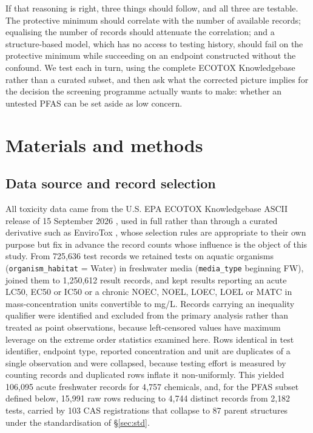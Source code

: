 \documentclass[preprint,12pt]{elsarticle}
\begin{document}
If that reasoning is right, three things should follow, and all three are
testable. The protective minimum should correlate with the number of available
records; equalising the number of records should attenuate the correlation; and
a structure-based model, which has no access to testing history, should fail on
the protective minimum while succeeding on an endpoint constructed without the
confound. We test each in turn, using the complete ECOTOX Knowledgebase rather
than a curated subset, and then ask what the corrected picture implies for the
decision the screening programme actually wants to make: whether an untested
PFAS can be set aside as low concern.

\section{Materials and methods}

\subsection{Data source and record selection}

All toxicity data came from the U.S. EPA ECOTOX Knowledgebase ASCII release of
15 September 2026 \cite{olker2022ecotox}, used in full rather than through a
curated derivative such as EnviroTox \cite{connors2019envirotox}, whose
selection rules are appropriate to their own purpose but fix in advance the
record counts whose influence is the object of this study. From 725{,}636 test records we retained tests on aquatic
organisms (\texttt{organism\_habitat} = Water) in freshwater media
(\texttt{media\_type} beginning FW), joined them to 1{,}250{,}612 result
records, and kept results reporting an acute LC50, EC50 or IC50 or a chronic
NOEC, NOEL, LOEC, LOEL or MATC in mass-concentration units convertible to mg/L. Records
carrying an inequality qualifier were identified and excluded from the primary
analysis rather than treated as point observations, because left-censored values
have maximum leverage on the extreme order statistics examined here. Rows identical in test
identifier, endpoint type, reported concentration and unit are duplicates of a
single observation and were collapsed, because testing effort is measured by
counting records and duplicated rows inflate it non-uniformly. This yielded
106{,}095 acute freshwater records for 4{,}757 chemicals, and, for the PFAS
subset defined below, 15{,}991 raw rows reducing to 4{,}744 distinct records
from 2{,}182 tests, carried by 103 CAS registrations that collapse to 87 parent
structures under the standardisation of \S\ref{sec:std}.
\end{document}
